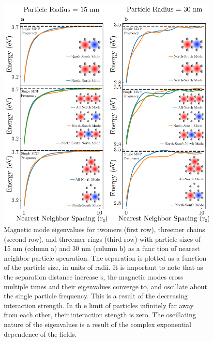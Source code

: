 \documentclass[journal=apchd5,manuscript=article]{achemso}
\begin{document}
\begin{figure}
\centering
\includegraphics[width=.65\paperwidth]{spacing_study.png}
\caption{Magnetic mode eigenvalues for twomers (first row), threemer chains (second row), and threemer rings (third row) with particle sizes of 15 nm (column a) and 30 nm (column b) as a func
tion of nearest neighbor particle spearation. The separation is plotted as a function of the particle size, in units of radii. It is important to note that as the separation distance increase
s, the magnetic modes cross multiple times and their eigenvalues converge to, and oscillate about the single particle frequency. This is a result of the decreasing interaction strength. In th
e limit of particles infinitely far away from each other, their interaction stength is zero. The oscillating nature of the eigenvalues is a result of the complex exponential dependence of the
 fields.}
\label{fig:spacing}
\end{figure}
\end{document}
